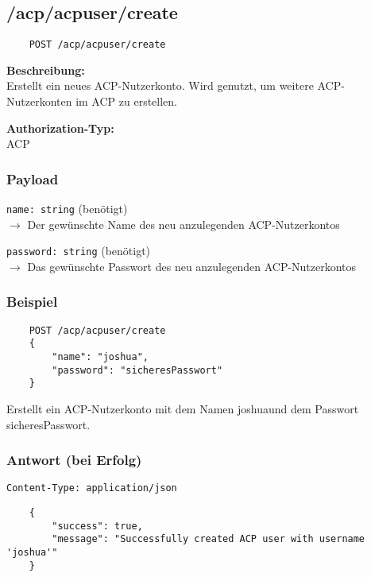 \subsection{/acp/acpuser/create}

\begin{lstlisting}
    POST /acp/acpuser/create
\end{lstlisting}

\textbf{Beschreibung:} \\
Erstellt ein neues ACP-Nutzerkonto. Wird genutzt, um weitere ACP-Nutzerkonten im ACP zu erstellen.

\textbf{Authorization-Typ:} \\
ACP

\subsubsection{Payload}

\lstinline{name: string} (benötigt) \\
$\rightarrow$ Der gewünschte Name des neu anzulegenden ACP-Nutzerkontos

\lstinline{password: string} (benötigt) \\
$\rightarrow$ Das gewünschte Passwort des neu anzulegenden ACP-Nutzerkontos

\subsubsection{Beispiel}

\begin{lstlisting}
    POST /acp/acpuser/create
    {
        "name": "joshua",
        "password": "sicheresPasswort"
    }
\end{lstlisting}

Erstellt ein ACP-Nutzerkonto mit dem Namen \glqq joshua\grqq und dem Passwort \glqq sicheresPasswort\grqq.

\subsubsection{Antwort (bei Erfolg)}

\lstinline{Content-Type: application/json}
\begin{lstlisting}
    {
        "success": true, 
        "message": "Successfully created ACP user with username 'joshua'"
    }
\end{lstlisting}